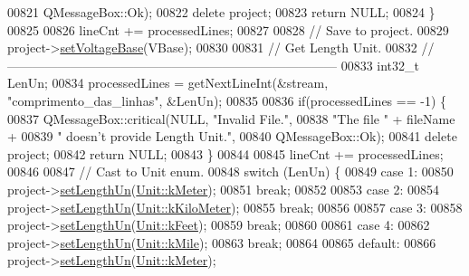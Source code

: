 \begin{DoxyCode}
00821                           QMessageBox::Ok);
00822     \textcolor{keyword}{delete} project;
00823     \textcolor{keywordflow}{return} NULL;
00824   \}
00825 
00826   lineCnt += processedLines;
00827 
00828 \textcolor{comment}{// Save to project.}
00829   project->\hyperlink{class_project_a494c3e89851f754188c7abaedbf77ef6}{setVoltageBase}(VBase);
00830 
00831 \textcolor{comment}{// Get Length Unit.}
00832 \textcolor{comment}{//------------------------------------------------------------------------------}
00833   int32\_t LenUn;
00834   processedLines = getNextLineInt(&stream, \textcolor{stringliteral}{"comprimento\_das\_linhas"}, &LenUn);
00835 
00836   \textcolor{keywordflow}{if}(processedLines == -1) \{
00837     QMessageBox::critical(NULL, \textcolor{stringliteral}{"Invalid File."},
00838                           \textcolor{stringliteral}{"The file "} + fileName +
00839                           \textcolor{stringliteral}{" doesn't provide Length Unit."},
00840                           QMessageBox::Ok);
00841     \textcolor{keyword}{delete} project;
00842     \textcolor{keywordflow}{return} NULL;
00843   \}
00844 
00845   lineCnt += processedLines;
00846 
00847 \textcolor{comment}{// Cast to Unit enum.}
00848   \textcolor{keywordflow}{switch} (LenUn) \{
00849   \textcolor{keywordflow}{case} 1:
00850     project->\hyperlink{class_project_a846ee2284b0856d461b35d78d9f8e1d6}{setLengthUn}(\hyperlink{class_unit_a8c8921f7b225ad6063b1cb573425b9a0abfa41ebe7ee649a1f02c9b8ae570434b}{Unit::kMeter});
00851     \textcolor{keywordflow}{break};
00852 
00853   \textcolor{keywordflow}{case} 2:
00854     project->\hyperlink{class_project_a846ee2284b0856d461b35d78d9f8e1d6}{setLengthUn}(\hyperlink{class_unit_a8c8921f7b225ad6063b1cb573425b9a0a1c04f3dd196dbe1832a2658215b0d919}{Unit::kKiloMeter});
00855     \textcolor{keywordflow}{break};
00856 
00857   \textcolor{keywordflow}{case} 3:
00858     project->\hyperlink{class_project_a846ee2284b0856d461b35d78d9f8e1d6}{setLengthUn}(\hyperlink{class_unit_a8c8921f7b225ad6063b1cb573425b9a0a9ac9b167b0ebce477fb53d6ace04ddc8}{Unit::kFeet});
00859     \textcolor{keywordflow}{break};
00860 
00861   \textcolor{keywordflow}{case} 4:
00862     project->\hyperlink{class_project_a846ee2284b0856d461b35d78d9f8e1d6}{setLengthUn}(\hyperlink{class_unit_a8c8921f7b225ad6063b1cb573425b9a0a2ebde742068bbee0510de32fbb4cd724}{Unit::kMile});
00863     \textcolor{keywordflow}{break};
00864 
00865   \textcolor{keywordflow}{default}:
00866     project->\hyperlink{class_project_a846ee2284b0856d461b35d78d9f8e1d6}{setLengthUn}(\hyperlink{class_unit_a8c8921f7b225ad6063b1cb573425b9a0abfa41ebe7ee649a1f02c9b8ae570434b}{Unit::kMeter});

\end{DoxyCode}
